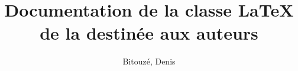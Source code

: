 \documentclass{gztarticle}
\begin{document}
\title[short=Documentation de la classe de la \emph{Gazette} destinée aux
auteurs]{Documentation de la classe \LaTeX{} de la \gzt*{} destinée aux auteurs}
%
\author[%
affiliation={%
  Université du Littoral Côte d'Opale, Laboratoire de mathématiques pures et
  appliquées%
},%
photo=Denis,%
email=denis.bitouze@lmpa.univ-littoral.fr,%
webpage=http://gte.univ-littoral.fr/members/dbitouze/pub/latex/,%
]{Bitouzé, Denis}
%
\maketitle*
%
\localtableofcontents
%




%
\printindex
%
\printbibliography
\end{document}

